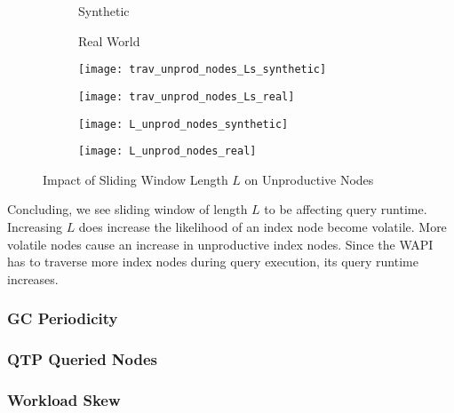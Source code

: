 \message{ !name(thesis.tex)}\documentclass[abstracton,12pt]{scrartcl}
\theoremstyle{definition}
\begin{document}
\begin{figure}
  \centering
  \begin{subfigure}{0.49\linewidth}
    \centering
    Synthetic
  \end{subfigure}
  \begin{subfigure}{0.49\linewidth}
    \centering
    Real World
  \end{subfigure}
  \begin{subfigure}{0.49\linewidth}
    \centering
    \texttt{[image: trav\_unprod\_nodes\_Ls\_synthetic]}
    \caption{}
    \label{fig:trav_unprod_nodes_Ls_synthetic}
  \end{subfigure}
  \begin{subfigure}{0.49\linewidth}
    \centering
    \texttt{[image: trav\_unprod\_nodes\_Ls\_real]}
    \caption{}
    \label{fig:trav_unprod_nodes_Ls_real}
  \end{subfigure}
  \begin{subfigure}{0.49\linewidth}
    \centering
    \texttt{[image: L\_unprod\_nodes\_synthetic]}
    \caption{}
    \label{fig:L_trav_unprod_nodes_synthetic}
  \end{subfigure}
  \begin{subfigure}{0.49\linewidth}
    \centering
    \texttt{[image: L\_unprod\_nodes\_real]}
    \caption{}
    \label{fig:L_trav_unprod_nodes_real}
  \end{subfigure}
  \caption{Impact of Sliding Window Length $L$ on Unproductive Nodes}
\end{figure}

Concluding, we see sliding window of length $L$ to be affecting query runtime.
Increasing $L$ does increase the likelihood of an index node become volatile.
More volatile nodes cause an increase in unproductive index nodes. Since the
WAPI has to traverse more index nodes during query execution, its query runtime
increases.

\subsubsection{GC Periodicity}

\subsubsection{QTP Queried Nodes}
\label{sec:qtp-queried-nodes}
\subsubsection{Workload Skew}
\end{document}

